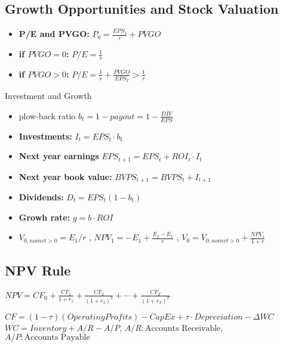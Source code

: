 \subsection*{Growth Opportunities and Stock Valuation}

\begin{itemize}
	\item {\bf P/E and PVGO:} $ P_0 = \frac{EPS_1}{r} + PVGO $
	\item {\bf if $PVGO=0$:} $ P/E = \frac{1}{r}  $
	\item {\bf if $PVGO>0$:} $ P/E = \frac{1}{r} + \frac{PVGO}{EPS_2} > \frac{1}{r} $
\end{itemize}
Investment and Growth
\begin{itemize}
	\item {plow-back ratio} $b_t = 1-payout = 1-\frac{DIV}{EPS}$
	\item {\bf Investments:} $ I_t = EPS_t \cdot b_t $
	\item {\bf Next year earnings} $ EPS_{t+1} = EPS_t +ROI_t \cdot I_t $
	\item {\bf Next year book value:} $ BVPS_{t+1} = BVPS_t + I_{t+1} $
	\item {\bf Dividends:} $ D_t = EPS_t (1-b_t) $
	\item {\bf Growh rate:} $g = b \cdot ROI$
	\item  $V_{0,no inv t>0}=E_1/r$ , $NPV_1 = -E_1 + \frac{E_2-E_1}{r}$ ,  $V_0 = V_{0,no inv t>0}+\frac{NPV_1}{1+r}$		
\end{itemize}


\subsection*{NPV Rule}
$NPV = CF_0 + \frac{CF_1}{1+r_1}+\frac{CF_2}{(1+r_2)^2} + \cdots + \frac{CF_T}{(1+r_T)^T} $

	$CF = (1-\tau) (OperatingProfits) - CapEx + \tau \cdot Depreciation -\Delta WC $\\
	$WC = Inventory + A/R - A/P$, $A/R : \text{Accounts Receivable}$, $A/P : \text{Accounts Payable}$
	
	